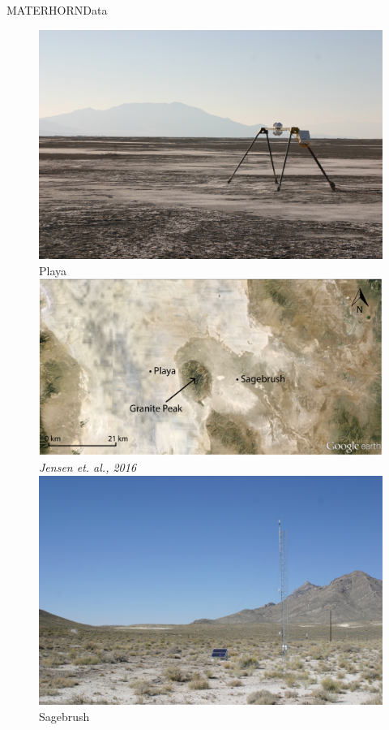 \documentclass{beamer}
\begin{document}
\begin{frame}{MATERHORN}{Data}
	\begin{figure}
	\centering
		\includegraphics[width=\linewidth]{pictures/IMG_5488}
		\\ Playa
	\endminipage\hfill
	\centering
		\includegraphics[width=\linewidth]{pictures/sitemap}
		\\ \tiny{\textit{Jensen et. al., 2016}}
	\endminipage\hfill
	\centering
		\includegraphics[width=\linewidth]{pictures/IMG_5440}
		\\ Sagebrush
	\endminipage\hfill
	\end{figure}
\end{frame}
\end{document}
